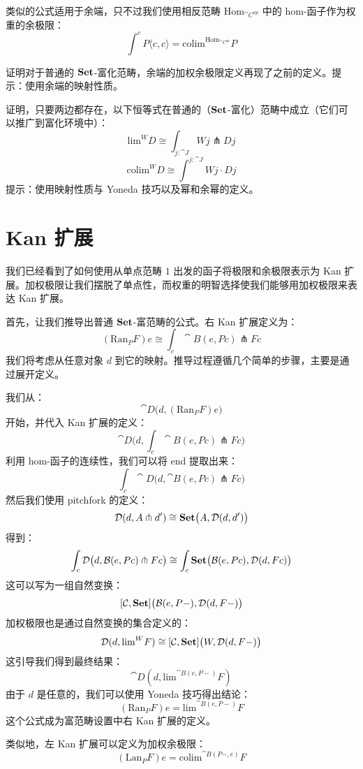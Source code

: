 \documentclass[DaoFP]{subfiles}
\begin{document}
类似的公式适用于余端，只不过我们使用相反范畴 $\text{Hom}_{\cat C^{op}}$ 中的 hom-函子作为权重的余极限：
\[  \int^c P\langle c, c\rangle = \text{colim}^{\text{Hom}_{\cat C^{op}}} P\]

\begin{exercise}
证明对于普通的 $\mathbf{Set}$-富化范畴，余端的加权余极限定义再现了之前的定义。提示：使用余端的映射性质。
\end{exercise}

\begin{exercise}
证明，只要两边都存在，以下恒等式在普通的（$\mathbf{Set}$-富化）范畴中成立（它们可以推广到富化环境中）：
\[ \text{lim}^W D \cong \int_{j \colon \cat J} W j \pitchfork D j \]
\[ \text{colim}^W D \cong \int^{j \colon \cat J} W j \cdot D j \]
提示：使用映射性质与 Yoneda 技巧以及幂和余幂的定义。
\end{exercise}

\section{Kan 扩展}

我们已经看到了如何使用从单点范畴 $1$ 出发的函子将极限和余极限表示为 Kan 扩展。加权极限让我们摆脱了单点性，而权重的明智选择使我们能够用加权极限来表达 Kan 扩展。

首先，让我们推导出普通 $\mathbf{Set}$-富范畴的公式。右 Kan 扩展定义为：
\[ (\text{Ran}_P F) e \cong \int_c \cat B (e, P c) \pitchfork F c \]
我们将考虑从任意对象 $d$ 到它的映射。推导过程遵循几个简单的步骤，主要是通过展开定义。

我们从：
\[ \cat D\big(d, (\text{Ran}_P F) e\big) \]
开始，并代入 Kan 扩展的定义：
\[ \cat D\big(d, \int_c \cat B (e, P c) \pitchfork F c\big) \]
利用 hom-函子的连续性，我们可以将 end 提取出来：
\[ \int_c \cat D\big(d,  \cat B (e, P c) \pitchfork F c\big) \]
然后我们使用 pitchfork 的定义：
\[ \mathcal{D} (d, A \pitchfork d') \cong \mathbf{Set}  \big(A, \mathcal{D}(d, d')\big) \]
得到：
\[ \int_c \mathcal{D}\big(d,  \mathcal{B} (e, P c) \pitchfork F c\big) \cong \int_c \mathbf{Set}\big( \mathcal{B}(e, P c), \mathcal{D}(d, F c)\big)\]
这可以写为一组自然变换：
\[ [\mathcal{C}, \mathbf{Set}] \big(\mathcal{B}(e, P-), \mathcal{D}(d, F-)\big) \]
加权极限也是通过自然变换的集合定义的：
\[  \mathcal D(d, \text{lim}^W F) \cong [\mathcal C, \mathbf{Set}] \big(W, \mathcal D(d, F-)\big) \]
这引导我们得到最终结果：
\[ \cat D(d, \text{lim}^{\cat B (e, P-)} F) \]
由于 $d$ 是任意的，我们可以使用 Yoneda 技巧得出结论：
\[ (\text{Ran}_P F) e = \text{lim}^{\cat B(e, P-)} F  \]
这个公式成为富范畴设置中右 Kan 扩展的定义。

类似地，左 Kan 扩展可以定义为加权余极限：
\[ (\text{Lan}_P F) e = \text{colim}^{\cat B(P-, e)} F \]
\end{document}
